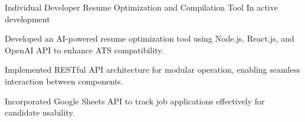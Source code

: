 \begin{cventries}
          \cventry
            {Individual Developer} %
            {Resume Optimization and Compilation Tool} %
            {} %
            {In active development} %
            {
              \begin{cvitems} %
              \item {Developed an AI-powered resume optimization tool using Node.js, React.js, and OpenAI API to enhance ATS compatibility.}
    \item {Implemented RESTful API architecture for modular operation, enabling seamless interaction between components.}
    \item {Incorporated Google Sheets API to track job applications effectively for candidate usability.}
              \end{cvitems}
            }
\end{cventries}
